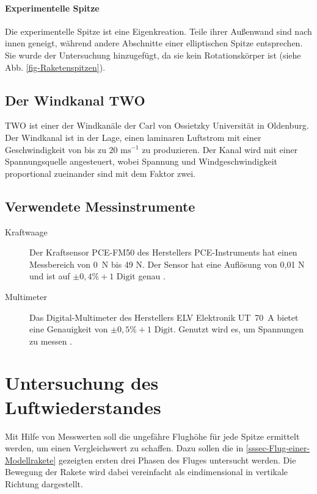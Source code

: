 \documentclass[10pt,a4paper]{article}
\begin{document}
\paragraph{Experimentelle Spitze}
Die experimentelle Spitze ist eine Eigenkreation. Teile ihrer Außenwand sind nach innen geneigt, während andere Abschnitte einer elliptischen Spitze entsprechen. Sie wurde der Untersuchung hinzugefügt, da sie kein Rotationskörper ist (siehe Abb. \ref{fig-Raketenspitzen}).


\subsection{Der Windkanal TWO}

TWO ist einer der Windkanäle der Carl von Ossietzky Universität in Oldenburg.
Der Windkanal ist in der Lage, einen laminaren Luftstrom mit einer Geschwindigkeit von bis zu $20 \text{ ms}^{-1}$ zu produzieren. Der Kanal wird mit einer Spannungsquelle angesteuert, wobei Spannung und Windgeschwindigkeit proportional zueinander sind mit dem Faktor zwei.


\subsection{Verwendete Messinstrumente}

\begin{description}
	\item[Kraftwaage] Der Kraftsensor PCE-FM50 des Herstellers PCE-Instruments hat einen Messbereich von 0~N bis 49 N. Der Sensor hat eine Auflösung von 0,01 N und ist auf $\pm 0,4 \% + 1 \text{ Digit}$ genau \cite{pce}.
	
	\item [Multimeter] Das Digital-Multimeter des Herstellers ELV Elektronik UT~70~A bietet eine Genauigkeit von $\pm0,5 \% + 1 \text{ Digit}$. Genutzt wird es, um Spannungen zu messen \cite{elv}.
\end{description}



\section{Untersuchung des Luftwiederstandes}

Mit Hilfe von Messwerten soll die ungefähre Flughöhe für jede Spitze ermittelt werden, um einen Vergleichswert zu schaffen. Dazu sollen die in \ref{sssec-Flug-einer-Modellrakete} gezeigten ersten drei Phasen des Fluges untersucht werden. Die Bewegung der Rakete wird dabei vereinfacht als eindimensional in vertikale Richtung dargestellt. 
\end{document}

